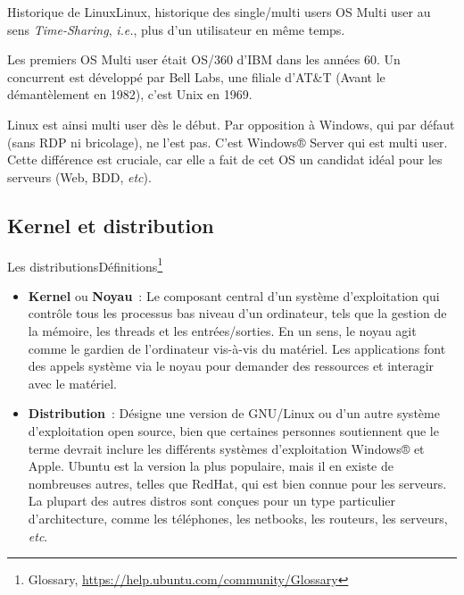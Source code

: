 \documentclass{beamer}
\begin{document}
    \begin{frame}{Historique de Linux}{Linux, historique des single/multi users OS}
        Multi user au sens \textit{Time-Sharing}, \textit{i.e.}, plus d'un utilisateur en même temps.

        Les premiers OS Multi user était OS/360 d'IBM dans les années 60.
        Un concurrent est développé par Bell Labs, une filiale d'AT\&T (Avant le démantèlement en 1982), c'est Unix en 1969.

        Linux est ainsi multi user dès le début.
        Par opposition à Windows, qui par défaut (sans RDP ni bricolage), ne l'est pas.
        C'est Windows® Server qui est multi user.
        \bigbreak
        Cette différence est cruciale, car elle a fait de cet OS un candidat idéal pour les serveurs (Web, BDD, \textit{etc}).
    \end{frame}

    \subsection{Kernel et distribution}\label{subsec:kernel-et-distribution}

    \begin{frame}{Les distributions}{Définitions\footnote{Glossary, \url{https://help.ubuntu.com/community/Glossary}}}
        \begin{itemize}
            \item \textbf{Kernel} ou \textbf{Noyau}~: Le composant central d'un système d'exploitation qui contrôle tous les processus bas niveau d'un ordinateur, tels que la gestion de la mémoire, les threads et les entrées/sorties.
            En un sens, le noyau agit comme le gardien de l'ordinateur vis-à-vis du matériel.
            Les applications font des appels système via le noyau pour demander des ressources et interagir avec le matériel.
            \item \textbf{Distribution}~: Désigne une version de GNU/Linux ou d'un autre système d'exploitation open source, bien que certaines personnes soutiennent que le terme devrait inclure les différents systèmes d'exploitation Windows® et Apple.
            Ubuntu est la version la plus populaire, mais il en existe de nombreuses autres, telles que RedHat, qui est bien connue pour les serveurs.
            La plupart des autres distros sont conçues pour un type particulier d'architecture, comme les téléphones, les netbooks, les routeurs, les serveurs, \textit{etc}.
        \end{itemize}
    \end{frame}
\end{document}
